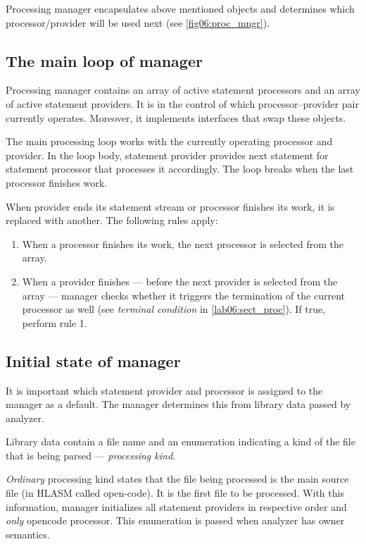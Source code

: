 Processing manager encapsulates above mentioned objects and determines which processor/provider will be used next (see \cref{fig06:proc_mngr}).


\subsection{The main loop of manager}
\label{lab06:mngr_loop}

Processing manager contains an array of active statement processors and an array of active statement providers. It is in the control of which processor--provider pair currently operates. Moreover, it implements interfaces that swap these objects.

The main processing loop works with the currently operating processor and provider. In the loop body, statement provider provides next statement for statement processor that processes it accordingly. The loop breaks when the last processor finishes work.

When provider ends its statement stream or processor finishes its work, it is replaced with another. The following rules apply:

\begin{enumerate}
	\item When a processor finishes its work, the next processor is selected from the array.
	\item When a provider finishes --- before the next provider is selected from the array --- manager checks whether it triggers the termination of the current processor as well (see \emph{terminal condition} in \cref{lab06:sect_proc}). If true, perform rule 1.
\end{enumerate}

\subsection{Initial state of manager}
\label{lab06:lib_data}

It is important which statement provider and processor is assigned to the manager as a default. The manager determines this from library data passed by analyzer.

Library data contain a file name and an enumeration indicating a kind of the file that is being parsed --- \emph{processing kind}.

\emph{Ordinary} processing kind states that the file being processed is the main source file (in HLASM called open-code). It is the first file to be processed. With this information, manager initializes all statement providers in respective order and \emph{only} opencode processor. This enumeration is passed when analyzer has owner semantics.

